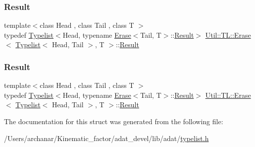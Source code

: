 \subsubsection{\texorpdfstring{Result}{Result}\hspace{0.1cm}{\footnotesize\ttfamily [1/2]}}
{\footnotesize\ttfamily template$<$class Head , class Tail , class T $>$ \\
typedef \mbox{\hyperlink{structUtil_1_1Typelist}{Typelist}}$<$Head, typename \mbox{\hyperlink{structUtil_1_1TL_1_1Erase}{Erase}}$<$Tail, T$>$\+::\mbox{\hyperlink{structUtil_1_1TL_1_1Erase_3_01Typelist_3_01Head_00_01Tail_01_4_00_01T_01_4_a68b3e32a3703ec33f196f25e84e3841e}{Result}}$>$ \mbox{\hyperlink{structUtil_1_1TL_1_1Erase}{Util\+::\+T\+L\+::\+Erase}}$<$ \mbox{\hyperlink{structUtil_1_1Typelist}{Typelist}}$<$ Head, Tail $>$, T $>$\+::\mbox{\hyperlink{structUtil_1_1TL_1_1Erase_3_01Typelist_3_01Head_00_01Tail_01_4_00_01T_01_4_a68b3e32a3703ec33f196f25e84e3841e}{Result}}}

\mbox{\label{structUtil_1_1TL_1_1Erase_3_01Typelist_3_01Head_00_01Tail_01_4_00_01T_01_4_a68b3e32a3703ec33f196f25e84e3841e}} 
\subsubsection{\texorpdfstring{Result}{Result}\hspace{0.1cm}{\footnotesize\ttfamily [2/2]}}
{\footnotesize\ttfamily template$<$class Head , class Tail , class T $>$ \\
typedef \mbox{\hyperlink{structUtil_1_1Typelist}{Typelist}}$<$Head, typename \mbox{\hyperlink{structUtil_1_1TL_1_1Erase}{Erase}}$<$Tail, T$>$\+::\mbox{\hyperlink{structUtil_1_1TL_1_1Erase_3_01Typelist_3_01Head_00_01Tail_01_4_00_01T_01_4_a68b3e32a3703ec33f196f25e84e3841e}{Result}}$>$ \mbox{\hyperlink{structUtil_1_1TL_1_1Erase}{Util\+::\+T\+L\+::\+Erase}}$<$ \mbox{\hyperlink{structUtil_1_1Typelist}{Typelist}}$<$ Head, Tail $>$, T $>$\+::\mbox{\hyperlink{structUtil_1_1TL_1_1Erase_3_01Typelist_3_01Head_00_01Tail_01_4_00_01T_01_4_a68b3e32a3703ec33f196f25e84e3841e}{Result}}}



The documentation for this struct was generated from the following file\+:\begin{DoxyCompactItemize}
\item 
/\+Users/archanar/\+Kinematic\+\_\+factor/adat\+\_\+devel/lib/adat/\mbox{\hyperlink{lib_2adat_2typelist_8h}{typelist.\+h}}\end{DoxyCompactItemize}

